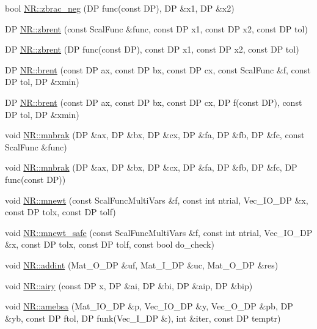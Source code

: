 \begin{DoxyCompactItemize}
\item 
bool \mbox{\hyperlink{namespaceNR_ae680e6f764b658f8a61651eb172b4cab}{N\+R\+::zbrac\+\_\+neg}} (DP func(const DP), DP \&x1, DP \&x2)
\item 
DP \mbox{\hyperlink{namespaceNR_ac5818de945dc13deb3bf29c2eda04523}{N\+R\+::zbrent}} (const Scal\+Func \&func, const DP x1, const DP x2, const DP tol)
\item 
DP \mbox{\hyperlink{namespaceNR_a65e397db7c70abaac50b73cd18a8b8ae}{N\+R\+::zbrent}} (DP func(const DP), const DP x1, const DP x2, const DP tol)
\item 
DP \mbox{\hyperlink{namespaceNR_aff9bab8f86d05c799cb643f8d3f4727b}{N\+R\+::brent}} (const DP ax, const DP bx, const DP cx, const Scal\+Func \&f, const DP tol, DP \&xmin)
\item 
DP \mbox{\hyperlink{namespaceNR_a949db0b9cc65ac1f2224f5c48384f58a}{N\+R\+::brent}} (const DP ax, const DP bx, const DP cx, DP f(const DP), const DP tol, DP \&xmin)
\item 
void \mbox{\hyperlink{namespaceNR_ab3df1c654ea34ede65a545dc399a8e43}{N\+R\+::mnbrak}} (DP \&ax, DP \&bx, DP \&cx, DP \&fa, DP \&fb, DP \&fc, const Scal\+Func \&func)
\item 
void \mbox{\hyperlink{namespaceNR_a3fb2c9900887232361156bb23c4a3035}{N\+R\+::mnbrak}} (DP \&ax, DP \&bx, DP \&cx, DP \&fa, DP \&fb, DP \&fc, DP func(const DP))
\item 
void \mbox{\hyperlink{namespaceNR_a9217e3777ed00b4cd6f83abd69e4cef9}{N\+R\+::mnewt}} (const Scal\+Func\+Multi\+Vars \&f, const int ntrial, Vec\+\_\+\+I\+O\+\_\+\+DP \&x, const DP tolx, const DP tolf)
\item 
void \mbox{\hyperlink{namespaceNR_a613c01d6d0517310d92cab226cef58bc}{N\+R\+::mnewt\+\_\+safe}} (const Scal\+Func\+Multi\+Vars \&f, const int ntrial, Vec\+\_\+\+I\+O\+\_\+\+DP \&x, const DP tolx, const DP tolf, const bool do\+\_\+check)
\item 
void \mbox{\hyperlink{namespaceNR_aaab613fb80abc0d628e6625e1a9e5f42}{N\+R\+::addint}} (Mat\+\_\+\+O\+\_\+\+DP \&uf, Mat\+\_\+\+I\+\_\+\+DP \&uc, Mat\+\_\+\+O\+\_\+\+DP \&res)
\item 
void \mbox{\hyperlink{namespaceNR_a90700ac65b3bb16117cdf03479f37529}{N\+R\+::airy}} (const DP x, DP \&ai, DP \&bi, DP \&aip, DP \&bip)
\item 
void \mbox{\hyperlink{namespaceNR_a268778b02b6b0174580ca6006fdbac02}{N\+R\+::amebsa}} (Mat\+\_\+\+I\+O\+\_\+\+DP \&p, Vec\+\_\+\+I\+O\+\_\+\+DP \&y, Vec\+\_\+\+O\+\_\+\+DP \&pb, DP \&yb, const DP ftol, DP funk(Vec\+\_\+\+I\+\_\+\+DP \&), int \&iter, const DP temptr)

\end{DoxyCompactItemize}

